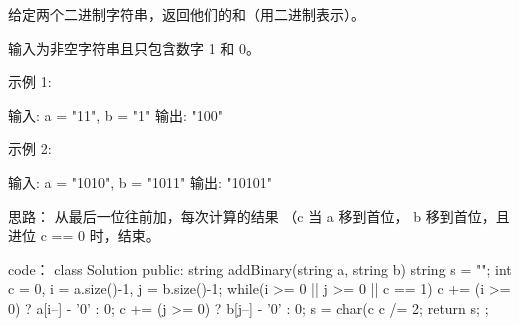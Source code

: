 给定两个二进制字符串，返回他们的和（用二进制表示）。

输入为非空字符串且只包含数字 1 和 0。

示例 1:

输入: a = "11", b = "1"
输出: "100"

示例 2:

输入: a = "1010", b = "1011"
输出: "10101"





























思路：
从最后一位往前加，每次计算的结果 （c %
当 a 移到首位， b 移到首位，且进位 c == 0 时，结束。

























code：
class Solution {
public:
    string addBinary(string a, string b) {
        string s = "";
        int c = 0, i = a.size()-1, j = b.size()-1;
        while(i >= 0 || j >= 0 || c == 1)
        {
            c += (i >= 0) ? a[i--] - '0' : 0;
            c += (j >= 0) ? b[j--] - '0' : 0;
            s = char(c%
            c /= 2;
        }
        return s;
    }
};